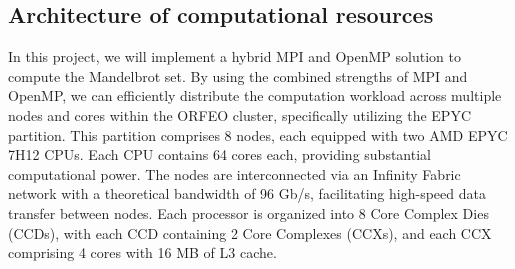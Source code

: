 \subsection{Architecture of computational resources}

In this project, we will implement a hybrid MPI and OpenMP solution to compute the Mandelbrot set. By using the combined strengths of MPI and OpenMP, we can efficiently distribute the computation workload across multiple nodes and cores within the ORFEO cluster, specifically utilizing the EPYC partition. This partition comprises 8 nodes, each equipped with two AMD EPYC 7H12 CPUs. Each CPU contains 64 cores each, providing substantial computational power. The nodes are interconnected via an Infinity Fabric network with a theoretical bandwidth of 96 Gb/s, facilitating high-speed data transfer between nodes. Each processor is organized into 8 Core Complex Dies (CCDs), with each CCD containing 2 Core Complexes (CCXs), and each CCX comprising 4 cores with 16 MB of L3 cache.
